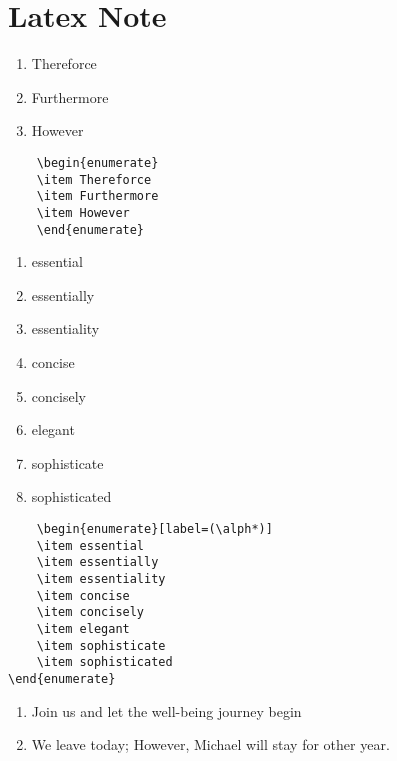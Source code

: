 \documentclass{article}
\begin{document}
\section{Latex Note}


\begin{enumerate}
\item Thereforce 
\item Furthermore 
\item However 
\end{enumerate}

\begin{verbatim}
    \begin{enumerate}
    \item Thereforce 
    \item Furthermore 
    \item However 
    \end{enumerate}
\end{verbatim}

\begin{enumerate}[label=(\alph*)]
\item essential 
\item essentially 
\item essentiality 
\item concise 
\item concisely 
\item elegant 
\item sophisticate 
\item sophisticated
\end{enumerate}

\begin{verbatim}
    \begin{enumerate}[label=(\alph*)]
    \item essential 
    \item essentially 
    \item essentiality 
    \item concise 
    \item concisely 
    \item elegant 
    \item sophisticate 
    \item sophisticated
\end{enumerate}

\end{verbatim}

\begin{enumerate}[label=(\roman*)]
\item Join us and let the well-being journey begin 
\item We leave today; However, Michael will stay for other year. 
\end{enumerate}
\end{document}
